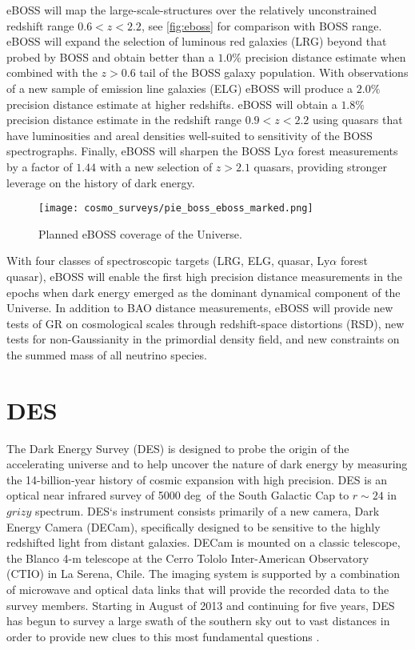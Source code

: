 eBOSS will map the large-scale-structures over the relatively unconstrained redshift range $0.6<z< 2.2$, see \autoref{fig:eboss} for comparison with BOSS range. eBOSS will expand the selection of luminous red galaxies (LRG) beyond that probed by BOSS and obtain better than a $1.0\%$ precision distance estimate when combined with the $z > 0.6$ tail of the BOSS galaxy population. With observations of a new sample of emission line galaxies (ELG) eBOSS will produce a $2.0\%$ precision distance estimate at higher redshifts. eBOSS will obtain a $1.8\%$ precision distance estimate in the redshift range $0.9 < z < 2.2$ using quasars that have luminosities and areal densities well-suited to sensitivity of the BOSS spectrographs. Finally, eBOSS will sharpen the BOSS Ly$\alpha$ forest measurements by a factor of $1.44$ with a new selection of $z > 2.1$ quasars, providing stronger leverage on the history of dark energy.
\begin{figure}[ht]
    \centering
    \texttt{[image: cosmo\_surveys/pie\_boss\_eboss\_marked.png]}
    \caption{Planned eBOSS coverage of the Universe.}
    \label{fig:eboss}
\end{figure}

With four classes of spectroscopic targets (LRG, ELG, quasar, Ly$\alpha$ forest quasar), eBOSS will enable the first high precision distance measurements in the epochs when dark energy emerged as the dominant dynamical component of the Universe. In addition to BAO distance measurements, eBOSS will provide new tests of GR on cosmological scales through redshift-space distortions (RSD), new tests for non-Gaussianity in the primordial density field, and new constraints on the summed mass of all neutrino species.
\section{DES}
\label{DES}
The Dark Energy Survey (DES) is designed to probe the origin of the accelerating universe and to help uncover the nature of dark energy by measuring the \mbox{14-billion-year} history of cosmic expansion with high precision. DES is an optical near infrared survey of 5000 deg\sq\ of the South Galactic Cap to $r\sim24$ in $grizy$ spectrum.  DES`s instrument consists primarily of a new camera, Dark Energy Camera (DECam), specifically designed to be sensitive to the highly redshifted light from distant galaxies. DECam is mounted on a classic telescope, the Blanco 4-m telescope at the Cerro Tololo Inter-American Observatory (CTIO) in La Serena, Chile. The imaging system is supported by a combination of microwave and optical data links that will provide the recorded data to the survey members. Starting in August of 2013 and continuing for five years, DES has begun to survey a large swath of the southern sky out to vast distances in order to provide new clues to this most fundamental questions \cite{DES}.

